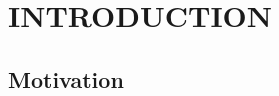 


\section{\uppercase{Introduction}}
\label{sec:Introduction}
\noindent

\subsection{Motivation}
\label{subsec:Motiviation}
\noindent
